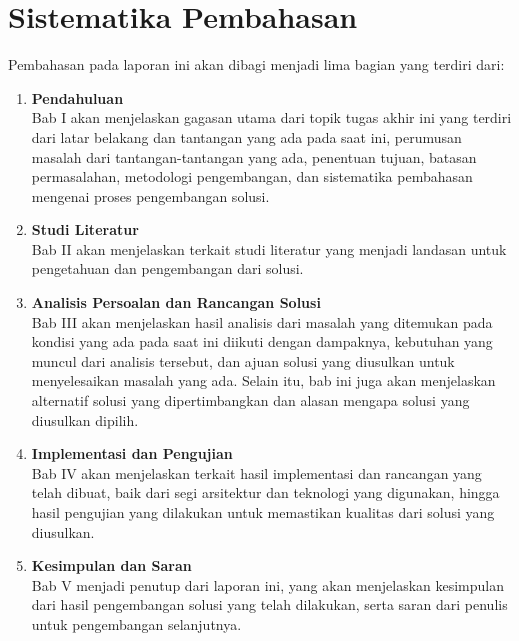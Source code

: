 \section{Sistematika Pembahasan}

Pembahasan pada laporan ini akan dibagi menjadi lima bagian yang terdiri dari:

\begin{enumerate}
  \item \textbf{Pendahuluan} \\
  Bab I akan menjelaskan gagasan utama dari topik tugas akhir ini yang terdiri dari latar belakang dan tantangan yang ada pada saat ini, perumusan masalah dari tantangan-tantangan yang ada, penentuan tujuan, batasan permasalahan, metodologi pengembangan, dan sistematika pembahasan mengenai proses pengembangan solusi.
  \item \textbf{Studi Literatur} \\
  Bab II akan menjelaskan terkait studi literatur yang menjadi landasan untuk pengetahuan dan pengembangan dari solusi.
  \item \textbf{Analisis Persoalan dan Rancangan Solusi} \\
  Bab III akan menjelaskan hasil analisis dari masalah yang ditemukan pada kondisi yang ada pada saat ini diikuti dengan dampaknya, kebutuhan yang muncul dari analisis tersebut, dan ajuan solusi yang diusulkan untuk menyelesaikan masalah yang ada. Selain itu, bab ini juga akan menjelaskan alternatif solusi yang dipertimbangkan dan alasan mengapa solusi yang diusulkan dipilih.
  \item \textbf{Implementasi dan Pengujian} \\
  Bab IV akan menjelaskan terkait hasil implementasi dan rancangan yang telah dibuat, baik dari segi arsitektur dan teknologi yang digunakan, hingga hasil pengujian yang dilakukan untuk memastikan kualitas dari solusi yang diusulkan.
  \item \textbf{Kesimpulan dan Saran} \\
  Bab V menjadi penutup dari laporan ini, yang akan menjelaskan kesimpulan dari hasil pengembangan solusi yang telah dilakukan, serta saran dari penulis untuk pengembangan selanjutnya.
\end{enumerate}
